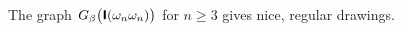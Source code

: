 \begin{figure}[htbp]
{	}

	\caption[$\I(\omega_n \omega_n)$, $n\geq 3$]
	{The graph $G_\beta\big(\textsf{\textbf{I}}(\omega_n \omega_n)\big)$ for $n\geq 3$ gives
	nice, regular drawings.}
	\label{fig:images_DoubleSnake_1_CIRCO}
\end{figure}

